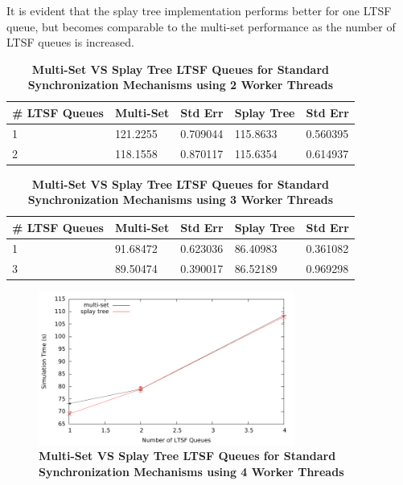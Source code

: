 \documentclass[11pt]{book}
\begin{document}
It is evident that the splay tree implementation performs better for one LTSF
queue, but becomes comparable to the multi-set performance as the number of LTSF
queues is increased.  

\begin{table}[H]
    \centering
    \begin{tabular}{l|p{2cm}|p{2cm}|p{2cm}|p{2cm}}
        \textbf{\# LTSF Queues}&Multi-Set &Std Err &Splay Tree &Std Err\\
        \hline
        \midrule
            1 &121.2255  &0.709044 &115.8633  &0.560395\\ 
            2 &118.1558  &0.870117 &115.6354  &0.614937\\
    \end{tabular}
    \caption{\textbf{Multi-Set VS Splay Tree LTSF Queues for Standard
    Synchronization Mechanisms using 2 Worker Threads}}
    \label{tab:noThrMig_2threadsXschq_msVSst_std}
\end{table}

\begin{table}[H]
\centering
\begin{tabular}{l|p{2cm}|p{2cm}|p{2cm}|p{2cm}}
    \textbf{\# LTSF Queues}&Multi-Set &Std Err &Splay Tree &Std Err\\
    \hline
    \midrule
        1 &91.68472  &0.623036 &86.40983  &0.361082\\ 
        3 &89.50474  &0.390017 &86.52189  & 0.969298\\
\end{tabular}
\caption{\textbf{Multi-Set VS Splay Tree LTSF Queues for Standard
Synchronization Mechanisms using 3 Worker Threads}}
\label{tab:noThrMig_3threadsXschq_msVSst_std}
\end{table}

\begin{figure}[H]
    \centering
    \graphicspath{ {./figures/} }
    \includegraphics[width=0.75\textwidth,keepaspectratio]{hugeepidemicsim-NOmig-timeVSschedQs-msVSst-4thread-std}
\caption{\textbf{Multi-Set VS Splay Tree LTSF Queues for Standard
Synchronization Mechanisms using 4 Worker Threads}}
    \label{fig:noThrMig_timeVSschq_4threads_msVSst_std}
\end{figure}
\end{document}
